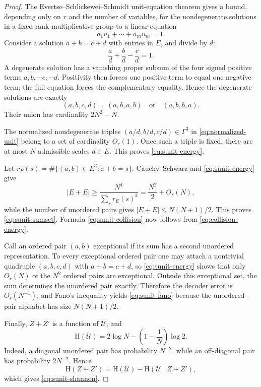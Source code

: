 \documentclass[11pt,oneside]{article}
\theoremstyle{definition}
\theoremstyle{remark}
\newcommand{\HH}{\mathrm{H}}
\newcommand{\abs}[1]{\left|#1\right|}
\begin{document}
\begin{proof}
The Evertse--Schlickewei--Schmidt unit-equation theorem \cite{EvertseSchlickeweiSchmidt2002} gives a bound, depending only on \(r\) and the number of variables, for the nondegenerate solutions in a fixed-rank multiplicative group to a linear equation
\[
 a_1u_1+\cdots+a_mu_m=1.
\]
Consider a solution \(a+b=c+d\) with entries in \(E\), and divide by \(d\):
\begin{equation}\label{eq:normalized-unit}
 \frac ad+\frac bd-\frac cd=1.
\end{equation}
A degenerate solution has a vanishing proper subsum of the four signed positive terms \(a,b,-c,-d\).  Positivity then forces one positive term to equal one negative term; the full equation forces the complementary equality.  Hence the degenerate solutions are exactly
\[
 (a,b,c,d)=(a,b,a,b)\quad\text{or}\quad(a,b,b,a).
\]
Their union has cardinality \(2N^2-N\).

The normalized nondegenerate triples \((a/d,b/d,c/d)\in\Gamma^3\) in \eqref{eq:normalized-unit} belong to a set of cardinality \(O_r(1)\).  Once such a triple is fixed, there are at most \(N\) admissible scales \(d\in E\).  This proves \eqref{eq:sunit-energy}.

Let \(r_E(s)=\#\{(a,b)\in E^2:a+b=s\}\).  Cauchy--Schwarz and \eqref{eq:sunit-energy} give
\[
 \abs{E+E}\geq\frac{N^4}{\sum_s r_E(s)^2}
 =\frac{N^2}{2}+O_r(N),
\]
while the number of unordered pairs gives \(\abs{E+E}\leq N(N+1)/2\).  This proves \eqref{eq:sunit-sumset}.  Formula \eqref{eq:sunit-collision} now follows from \eqref{eq:collision-energy}.

Call an ordered pair \((a,b)\) exceptional if its sum has a second unordered representation.  To every exceptional ordered pair one may attach a nontrivial quadruple \((a,b,c,d)\) with \(a+b=c+d\), so \eqref{eq:sunit-energy} shows that only \(O_r(N)\) of the \(N^2\) ordered pairs are exceptional.  Outside this exceptional set, the sum determines the unordered pair exactly.  Therefore the decoder error is \(O_r(N^{-1})\), and Fano's inequality \cite{CoverThomas2006} yields \eqref{eq:sunit-fano} because the unordered-pair alphabet has size \(N(N+1)/2\).

Finally, \(Z+Z'\) is a function of \(\mathcal U\), and
\begin{equation}\label{eq:unordered-entropy}
 \HH(\mathcal U)
 =2\log N-\left(1-\frac1N\right)\log2.
\end{equation}
Indeed, a diagonal unordered pair has probability \(N^{-2}\), while an off-diagonal pair has probability \(2N^{-2}\).  Hence
\[
 \HH(Z+Z')=\HH(\mathcal U)-\HH(\mathcal U\mid Z+Z'),
\]
which gives \eqref{eq:sunit-shannon}.
\end{proof}
\end{document}
